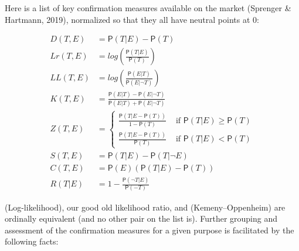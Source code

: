 \documentclass[10pt,dvipsnames,enabledeprecatedfontcommands]{scrartcl}
\newcommand{\n}{\neg}
\newcommand{\pr}[1]{\mathsf{P}(#1)}
\begin{document}
Here is a list of key confirmation measures available on the market
(Sprenger \& Hartmann, 2019), normalized so that they all have neutral
points at 0:

\begin{align}
\tag{Difference}  D(T,E) & = \pr{T\vert E} - \pr{T}\\
\tag{Log-ratio}  Lr(T,E) &  = log\left(\frac{\pr{T\vert E}}{\pr{T}} \right) \\
\tag{Log-likelihood}   LL(T,E) & = log\left(\frac{\pr{E \vert T}}{\pr{E \vert \n T}} \right)\\
\tag{Kemeny-Oppenheim}  K(T,E) & = \frac{\pr{E\vert T} - \pr{E \vert \n T}}{\pr{E \vert T} + \pr{E \vert \n T}} \\
\tag{Generalized entailment}  Z(T,E) & = \begin{cases}
\frac{\pr{T\vert E - \pr{T}}}{1-\pr{T}} & \mbox{ if } \pr{T \vert E} \geq \pr{T}\\
\frac{\pr{T\vert E - \pr{T}}}{\pr{T}} & \mbox{ if } \pr{T \vert E} < \pr{T}
\end{cases} \\
\tag{Christensen-Joyce} S(T,E) & = \pr{T \vert E} - \pr{T \vert \n E} \\
\tag{Carnap}  C(T,E) & = \pr{E}(\pr{T\vert E} - \pr{T})\\
\tag{Rips} R(T\vert E) & = 1 - \frac{\pr{\n T\vert E}}{\pr{-T}}
\end{align}

(Log-likelihood), our good old likelihood ratio, and (Kemeny--Oppenheim)
are ordinally equivalent (and no other pair on the list is). Further
grouping and assessment of the confirmation measures for a given purpose
is facilitated by the following facts:
\end{document}
